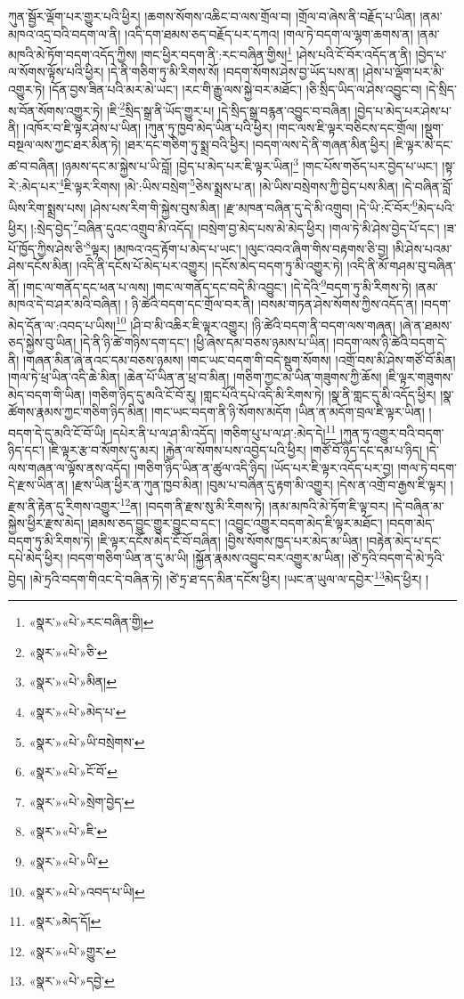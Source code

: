 ཀུན་སྦྱོར་ལྡོག་པར་གྱུར་པའི་ཕྱིར། །ཆགས་སོགས་འཆིང་བ་ལས་གྲོལ་བ། །གྲོལ་བ་ཞེས་ནི་བརྗོད་པ་ཡིན། །ནམ་མཁའ་འདྲ་བའི་བདག་ལ་ནི། །འདི་དག་ཐམས་ཅད་བརྗོད་པར་དཀའ། །གལ་ཏེ་བདག་ལ་ལྷག་ཆགས་ན། །ནམ་མཁའི་མེ་ཏོག་བདག་འདོད་ཀྱིས། །གང་ཕྱིར་བདག་ནི་:རང་བཞིན་གྱིས།\footnote{«སྣར་»«པེ་»རང་བཞིན་གྱི།} །ཤེས་པའི་ངོ་བོར་འདོད་ན་ནི། །བྱེད་པ་ལ་སོགས་ལྟོས་པའི་ཕྱིར། །དེ་ནི་གཅིག་ཏུ་མི་རིགས་སོ། །བདག་སོགས་ཤེས་བྱ་ཡོད་པས་ན། །ཤེས་པ་ལྡོག་པར་མི་འགྱུར་ཏེ། །དོན་བྱས་ཟིན་པའི་མར་མེ་ཡང་། །རང་གི་རྒྱུ་ལས་སྐྱེ་བར་མཐོང་། །ཅི་སྲིད་ཡིད་ལ་ཤེས་འབྱུང་བ། །དེ་སྲིད་ས་བོན་སོགས་འགྱུར་ཏེ། །ཇི་\footnote{«སྣར་»«པེ་»ཅི་}སྲིད་སྒྲ་ནི་ཡོད་གྱུར་པ། །དེ་སྲིད་སྒྲ་བརྙན་འབྱུང་བ་བཞིན། །བྱེད་པ་མེད་པར་ཤེས་པ་ནི། །འཁོར་བ་ཇི་ལྟར་ཤེས་པ་ཡིན། །ཀུན་ཏུ་ཁྱབ་མེད་ཡིན་པའི་ཕྱིར། །གང་ལས་ཇི་ལྟར་བཅིངས་དང་གྲོལ། །སྡུག་བསྔལ་ལས་ཀྱང་ཐར་མིན་ཏེ། །ཐར་དང་གཅིག་ཏུ་སྨྲ་བའི་ཕྱིར། །བདག་ལས་དེ་ནི་གཞན་མིན་ཕྱིར། །ཇི་ལྟར་མེ་དང་ཚ་བ་བཞིན། །ཉམས་དང་མ་སྐྱེས་པ་ཡི་བློ། །བྱེད་པ་མེད་པར་ཇི་ལྟར་ཡིན།\footnote{«སྣར་»«པེ་»མིན།} །གང་པོས་གཅོད་པར་བྱེད་པ་ཡང་། །སྟ་རེ་:མེད་པར་\footnote{«སྣར་»«པེ་»མེད་པ་}ཇི་ལྟར་རིགས། །མེ་:ཡིས་བསྲེག་\footnote{«སྣར་»«པེ་»ཡི་བསྲེགས་}ཅེས་སྨྲས་པ་ན། །མེ་ཡིས་བསྲེགས་ཀྱི་བྱེད་པས་མིན། །དེ་བཞིན་བློ་ཡིས་རིག་སྨྲས་པས། །ཤེས་པས་རིག་གི་སྐྱེས་བུས་མིན། །རྫ་མཁན་བཞིན་དུ་དེ་མི་འགྲུབ། །དེ་ཡི་:ངོ་བོར་\footnote{«སྣར་»«པེ་»ངོ་བོ་}མེད་པའི་ཕྱིར། །:སྲེད་བྱེད་\footnote{«སྣར་»«པེ་»སྲེག་བྱེད་}བཞིན་དུའང་འགྲུབ་མི་འདོད། །བསྲེག་བྱ་མེད་པས་མེ་མེད་ཕྱིར། །གལ་ཏེ་མི་ཤེས་བྱེད་པོ་དང་། །ཟ་པོ་ཁྱོད་ཀྱིས་ཤེས་ཅི་\footnote{«སྣར་»«པེ་»ཇི་}ལྟར། །མཁའ་འདྲ་རྟོག་པ་མེད་པ་ཡང་། །ལུང་འབའ་ཞིག་གིས་བརྟགས་ཅི་བྱ། །མི་ཤེས་པའམ་ཤེས་དངོས་མིན། །འདི་ནི་དངོས་པོ་མེད་པར་འགྱུར། །དངོས་མེད་བདག་ཏུ་མི་འགྱུར་ཏེ། །འདི་ནི་མོ་གཤམ་བུ་བཞིན་ནོ། །གང་ལ་གནོད་དང་ཕན་པ་ལས། །གང་ལ་གནོད་དང་བདེ་མི་འབྱུང་། །དེ་དེའི་\footnote{«སྣར་»«པེ་»ཡི་}བདག་ཏུ་མི་རིགས་ཏེ། །ནམ་མཁའ་དེ་བ་ཤར་མའི་བཞིན། །
ཉི་ཚེའི་བདག་དང་གྲོལ་བར་ནི། །བསམ་གཏན་ཤེས་སོགས་ཀྱིས་འདོད་ན། །བདག་མེད་དོན་ལ་:འབད་པ་ཡིས།\footnote{«སྣར་»«པེ་»འབད་པ་ཡི།} །ཤི་བ་མི་འཆིར་ཇི་ལྟར་འགྱུར། །ཉི་ཚེའི་བདག་ནི་བདག་ལས་གཞན། །ཞེ་ན་ཐམས་ཅད་སྐྱེས་བུ་ཡིན། །དེ་ནི་ཉི་ཚེ་གཉིས་དག་དང་། །ཕྱི་ཞེས་དམ་བཅས་ཉམས་པ་ཡིན། །བདག་ལས་ཉི་ཚེའི་བདག་དེ་ནི། །གཞན་མིན་ཞེ་ནའང་དམ་བཅས་ཉམས། །གང་ཡང་བདག་གི་བདེ་སྡུག་སོགས། །འགྲོ་བས་མི་ཤེས་གཙོ་བོ་མིན། །གལ་ཏེ་ཕྲ་ཡིན་འདི་ཆེ་མིན། །ཆེན་པོ་ཡིན་ན་ཕྲ་བ་མིན། །གཅིག་ཀྱང་མ་ཡིན་གཟུགས་ཀྱི་ཆོས། །ཇི་ལྟར་གཟུགས་མེད་བདག་གི་ཡིན། །གཅིག་ཉིད་དུ་མའི་ངོ་བོ་རུ། །གླང་པོའི་དཔེ་འདི་མི་རིགས་ཏེ། །སྣ་ནི་གླང་དུ་མི་འདོད་ཕྱིར། །སྣ་ཚོགས་རྣམས་ཀྱང་གཅིག་ཉིད་མིན། །གང་ཡང་བདག་ནི་ཉི་སོགས་མདོག །ཡིན་ན་མདོག་བྲལ་ཇི་ལྟར་ཡིན། །བདག་དེ་དུ་མའི་ངོ་བོ་ཡི། །དཔེར་ནི་པ་ལ་ཤ་མི་འདོད། །གཅིག་པུ་པ་ལ་ཤ་:མེད་དེ།\footnote{«སྣར་»མེད་དོ།} །ཀུན་ཏུ་འགྱུར་བའི་བདག་ཉིད་དང་། །ཇི་ལྟར་རྩ་བ་སོགས་དུ་མར། །རྐྱེན་ལ་སོགས་པས་འབྱེད་པའི་ཕྱིར། །གཙོ་བོ་ཉིད་དང་དམ་པ་ཉིད། །དེ་ལས་གཞན་ལ་ལྟོས་ནས་འདོད། །གཅིག་ཉིད་ཡིན་ན་ཚུལ་འདི་ཉིད། །ཡོད་པར་ཇི་ལྟར་འདོད་པར་བྱ། །གལ་ཏེ་བདག་དེ་རྫས་ཡིན་ན། །རྫས་ཡིན་ཕྱིར་ན་ཀུན་ཁྱབ་མིན། །བུམ་པ་བཞིན་དུ་རྟག་མི་འགྱུར། །དེས་ན་འགྲོ་བ་རྒྱས་ཇི་ལྟར། །རྫས་ནི་རྟེན་དུ་རིགས་འགྱུར་\footnote{«སྣར་»«པེ་»གྱུར་}ན། །བདག་ནི་རྫས་སུ་མི་རིགས་ཏེ། །ནམ་མཁའི་མེ་ཏོག་ཇི་ལྟ་བར། །དེ་བཞིན་མ་སྐྱེས་ཕྱིར་རྫས་མེད། །ཐམས་ཅད་བྱུང་གྱུར་བྱུང་བ་དང་། །འབྱུང་འགྱུར་བདག་མེད་ཇི་ལྟར་མཐོང་། །བདག་མེད་བདག་ཏུ་མི་རིགས་ཏེ། །ཇི་ལྟར་དངོས་མེད་ངོ་བོ་བཞིན། །བྱིས་སོགས་ཁྱད་པར་མེད་མ་ཡིན། །བརྟེན་མེད་པ་དང་དཔེ་མེད་ཕྱིར། །བདག་གཅིག་ཡིན་ན་དུ་མ་ཡི། །སྐྱོན་རྣམས་འབྱུང་བར་འགྱུར་མ་ཡིན། །ཙེ་ཏྲའི་བདག་དེ་མེ་ཏྲའི་བྱེད། །མེ་ཏྲའི་བདག་གིའང་དེ་བཞིན་ཏེ། །ཙེ་ཏྲ་ཐ་དད་མིན་དངོས་ཕྱིར། །ཡང་ན་ཡུལ་ལ་དབྱེར་\footnote{«སྣར་»«པེ་»དབྱེ་}མེད་ཕྱིར། །
